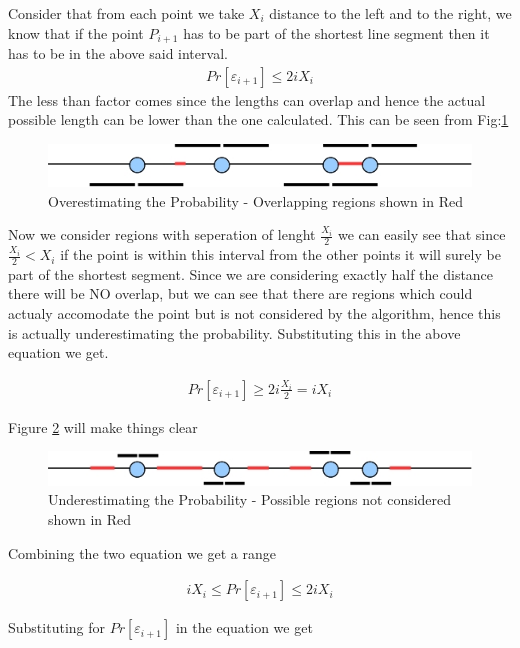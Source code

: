 \documentclass{assignment}
\begin{document}
\begin{problemlist}
\begin{problem}
\begin{answer}
\begin{enumerate}
Consider that from each point we take $X_i$ distance to the left and to the right, we know that if the point $P_{i+1}$ has to be part of the shortest line segment then it has to be in the above said interval. 
\begin{eqnarray}
  Pr [ \varepsilon_{i+1} ] \leq 2iX_i
\end{eqnarray}
The less than factor comes since the lengths can overlap and hence the actual possible length can be lower than the one calculated. This can be seen from Fig:\ref{fig:over} 
\begin{figure}
 \centering
 \includegraphics[scale=0.8]{over.jpg}
 \caption{Overestimating the Probability - Overlapping regions shown in Red}
 \label{fig:over}
\end{figure}

Now we consider regions with seperation of lenght $\frac{X_i}{2}$ we can easily see that since $\frac{X_i}{2} < X_i$ if the point is within this interval from the other points it will surely be part of the shortest segment. Since we are considering exactly half the distance there will be NO overlap, but we can see that there are regions which could actualy accomodate the point but is not considered by the algorithm, hence this is actually underestimating the probability. Substituting this in the above equation we get. 

\begin{eqnarray}
  Pr [ \varepsilon_{i+1} ] \geq 2i\frac{X_i}{2} = i X_i
\end{eqnarray}

Figure \ref{fig:under} will make things clear
\begin{figure}
 \centering
 \includegraphics[scale=0.8]{under.jpg}
 \caption{Underestimating the Probability - Possible regions not considered shown in Red}
 \label{fig:under}
\end{figure}
Combining the two equation we get a range 

\begin{eqnarray}
i X_i \leq   Pr [ \varepsilon_{i+1} ] \leq  2iX_i
\end{eqnarray}

Substituting for $Pr [ \varepsilon_{i+1} ]$ in the equation we get 


\end{enumerate}
\end{answer}
\end{problem}
\end{problemlist}
\end{document}
